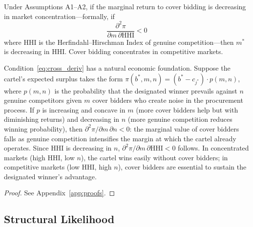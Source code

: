 \begin{proposition}
\label{prop:market_selection}
Under Assumptions A1--A2, if the marginal return to cover bidding is
decreasing in market concentration---formally, if
\begin{equation}
  \frac{\partial^2 \pi}{\partial m \, \partial \text{HHI}} < 0
  \label{eq:cross_deriv}
\end{equation}
where $\text{HHI}$ is the Herfindahl--Hirschman Index of genuine
competition---then $m^*$ is decreasing in HHI. Cover bidding
concentrates in competitive markets.
\end{proposition}

\noindent Condition~\eqref{eq:cross_deriv} has a natural economic
foundation. Suppose the cartel's expected surplus takes the form
$\pi(b^*, m, n) = (b^* - c_{j^*}) \cdot p(m, n)$, where $p(m, n)$
is the probability that the designated winner prevails against $n$
genuine competitors given $m$ cover bidders who create noise in the
procurement process. If $p$ is increasing and concave in $m$ (more
cover bidders help but with diminishing returns) and decreasing in
$n$ (more genuine competition reduces winning probability), then
$\partial^2 \pi / \partial m \, \partial n < 0$: the marginal value
of cover bidders falls as genuine competition intensifies the margin
at which the cartel already operates. Since HHI is decreasing in $n$,
$\partial^2 \pi / \partial m \, \partial \text{HHI} < 0$ follows. In
concentrated markets (high HHI, low $n$), the cartel wins easily
without cover bidders; in competitive markets (low HHI, high $n$),
cover bidders are essential to sustain the designated winner's
advantage.

\begin{proof}
See Appendix~\ref{app:proofs}.
\end{proof}


\subsection{Structural Likelihood}
\label{sec:likelihood}

